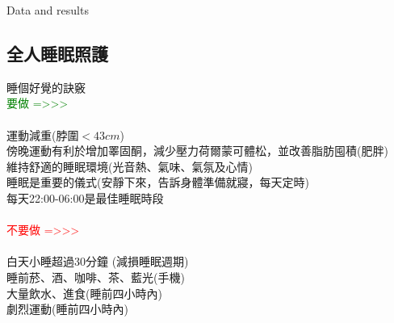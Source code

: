 \documentclass[aspectratio=169]{beamer}
\begin{document}
\begin{frame}{Data and results}
\subsection{全人睡眠照護}
\begin{block}{睡個好覺的訣竅}
~~\\
\textcolor{green}{要做 =>>>}\\
~~\\
運動減重(脖圍$< 43 cm$)\\
傍晚運動有利於增加睪固酮，減少壓力荷爾蒙可體松，並改善脂肪囤積(肥胖)\\
維持舒適的睡眠環境(光音熱、氣味、氣氛及心情)\\
睡眠是重要的儀式(安靜下來，告訴身體準備就寢，每天定時)\\
每天22:00-06:00是最佳睡眠時段\\


~~\\

\textcolor{red}{不要做 =>>>}\\
~~\\
白天小睡超過30分鐘 (減損睡眠週期)\\
睡前菸、酒、咖啡、茶、藍光(手機)\\
大量飲水、進食(睡前四小時內)\\
劇烈運動(睡前四小時內)\\
~~\\
~~\\
\end{block}
\end{frame}
\end{document}
